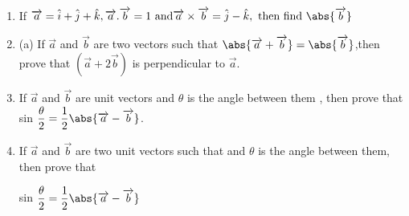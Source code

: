 \begin{enumerate}
\item If $\overrightarrow{a} = \hat{i} + \hat{ j} + \hat{ k} , \overrightarrow{a} . \overrightarrow{b} = 1 \text{ and} \overrightarrow{a} \times \overrightarrow{b} =\hat{j} - \hat{k}, \text { then find } \abs{\overrightarrow{b}}$
\item (a) If $\overrightarrow{ a}$  and  $\overrightarrow{b}$  are two vectors such that $\abs{\overrightarrow{a} + \overrightarrow{b}} = \abs{ \overrightarrow{b}}$,then prove that $(\overrightarrow{a} + 2\overrightarrow{b})$  is perpendicular to $\overrightarrow{ a}$.
\item If $\overrightarrow{ a}$ and $\overrightarrow{ b}$ are unit vectors and $\theta$ is the angle between them , then prove that sin $\dfrac{\theta}{ 2} = \dfrac{1}{2}\abs{\overrightarrow{ a} - \overrightarrow{ b}}$.
\item If $\overrightarrow{a}$ and $\overrightarrow{b}$  are two unit vectors such that and $\theta$ is the angle between them, then prove that                       
\begin{center}                                         
sin $\dfrac{ \theta}{2} = \dfrac{1}{2} \abs{\overrightarrow{a} - \overrightarrow{b}}$\\                       
\end{center}
\end{enumerate}


